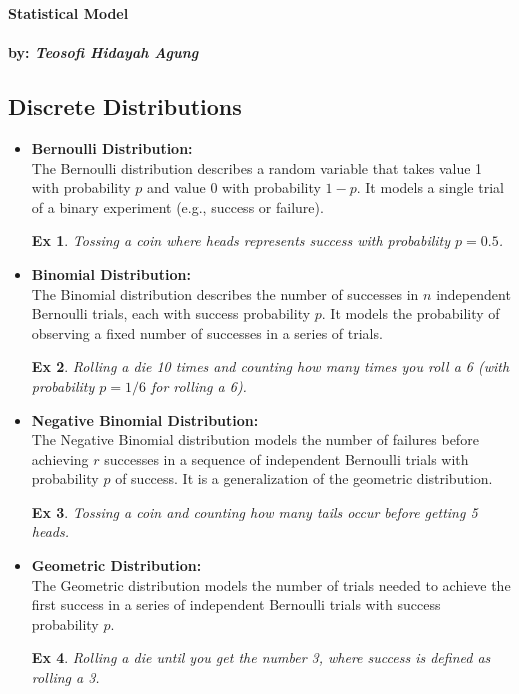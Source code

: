 \documentclass[a4paper,extrafontsizes, 9pt]{memoir}
\newtheorem*{ex}{Ex}
\begin{document}
\begin{center}
    \textbf{\LARGE Statistical Model}\\~\\
    \textbf{by: \textit{Teosofi Hidayah Agung}}
\end{center}
\begin{multicols}{2}
    \section*{Discrete Distributions}

\begin{itemize}
    \item \textbf{Bernoulli Distribution:} \\
    The Bernoulli distribution describes a random variable that takes value 1 with probability $p$ and value 0 with probability $1-p$. It models a single trial of a binary experiment (e.g., success or failure).
    \begin{ex}
        Tossing a coin where heads represents success with probability $p = 0.5$.
    \end{ex}

    \item \textbf{Binomial Distribution:} \\
    The Binomial distribution describes the number of successes in $n$ independent Bernoulli trials, each with success probability $p$. It models the probability of observing a fixed number of successes in a series of trials.
    \begin{ex}
        Rolling a die 10 times and counting how many times you roll a 6 (with probability $p = 1/6$ for rolling a 6).
    \end{ex}

    \item \textbf{Negative Binomial Distribution:} \\
    The Negative Binomial distribution models the number of failures before achieving $r$ successes in a sequence of independent Bernoulli trials with probability $p$ of success. It is a generalization of the geometric distribution.
    \begin{ex}
        Tossing a coin and counting how many tails occur before getting 5 heads.
    \end{ex}

    \item \textbf{Geometric Distribution:} \\
    The Geometric distribution models the number of trials needed to achieve the first success in a series of independent Bernoulli trials with success probability $p$.
    \begin{ex}
        Rolling a die until you get the number 3, where success is defined as rolling a 3.
    \end{ex}


\end{itemize}
\end{multicols}
\end{document}
